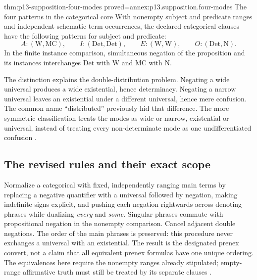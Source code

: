 \begin{hbtheorem}{thm:p13-supposition-four-modes}
 {proved=annex:p13.supposition.four-modes}
 {The four patterns in the categorical core}
With nonempty subject and predicate ranges and independent schematic
term occurrences, the declared categorical clauses have the following
patterns for subject and predicate:
\[
 A:(\mathrm W,\mathrm{MC}),\qquad
 I:(\mathrm{Det},\mathrm{Det}),\qquad
 E:(\mathrm W,\mathrm W),\qquad
 O:(\mathrm{Det},\mathrm N).
\]
In the finite instance comparison, simultaneous negation of the
proposition and its instances interchanges Det with W and MC with N.
\end{hbtheorem}

The distinction explains the double-distribution problem. Negating a
wide universal produces a wide existential, hence determinacy. Negating
a narrow universal leaves an existential under a different universal,
hence mere confusion. The common name ``distributed'' previously hid
that difference. The more symmetric classification treats the modes
as wide or narrow, existential or universal, instead of treating every
non-determinate mode as one undifferentiated confusion
\cite[pp.~268--270]{Parsons2007FordhamSupposition}.

\subsection{The revised rules and their exact scope}
\label{sec:p13-supposition-prefix}

Normalize a categorical with fixed, independently ranging main terms
by replacing a negative quantifier with a universal followed by
negation, making indefinite signs explicit, and pushing each negation
rightwards across denoting phrases while dualizing \emph{every} and
\emph{some}. Singular phrases commute with propositional negation in
the nonempty comparison. Cancel adjacent double negations. The order
of the main phrases is preserved: this procedure never exchanges a
universal with an existential. The result is the designated prenex
convert, not a claim that all equivalent prenex formulas have one
unique ordering. The equivalences here require the nonempty ranges
already stipulated; empty-range affirmative truth must still be treated
by its separate clauses
\cite[pp.~270--273]{Parsons2007FordhamSupposition}.

